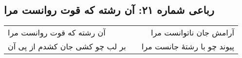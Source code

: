 \begin{center}
\section*{رباعی شماره ۲۱: آن رشته که قوت روانست مرا}
\label{sec:sh021}
\begin{longtable}{l p{0.5cm} r}
آن رشته که قوت روانست مرا
&&
آرامش جان ناتوانست مرا
\\
بر لب چو کشی جان کشدم از پی آن
&&
پیوند چو با رشتهٔ جانست مرا
\\
\end{longtable}
\end{center}
